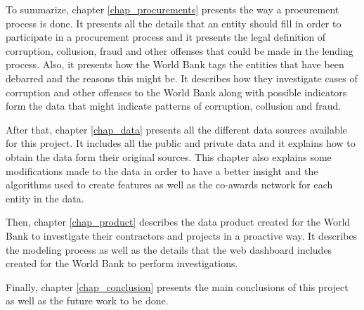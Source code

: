 To summarize, chapter \ref{chap_procurements} presents the way a procurement process is done. It presents all the details that an entity should fill in order to participate in a procurement process and it presents the legal definition of corruption, collusion, fraud and other offenses that could be made in the lending process. Also, it presents how the World Bank tags the entities that have been debarred and the reasons this might be. It describes how they investigate cases of corruption and other offenses to the World Bank along with possible indicators form the data that might indicate patterns of corruption, collusion and fraud.

After that, chapter \ref{chap_data} presents all the different data sources available for this project. It includes all the public and private data and it explains how to obtain the data form their original sources. This chapter also explains some modifications made to the data in order to have a better insight and the algorithms used to create features as well as the co-awards network for each entity in the data.

Then, chapter \ref{chap_product} describes the data product created for the World Bank to investigate their contractors and projects in a proactive way. It describes the modeling process as well as the details that the web dashboard includes created for the World Bank to perform investigations.

Finally, chapter \ref{chap_conclusion} presents the main conclusions of this project as well as the future work to be done.




